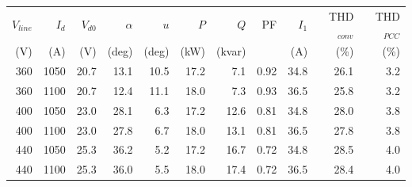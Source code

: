 \begin{tabular}{rrrrrrrrrrr}
\toprule
$V_{line}$ & $I_d$ & $V_{d0}$ & $\alpha$ & $u$ & $P$ & $Q$ & PF & $I_1$ & THD$_{conv}$ & THD$_{PCC}$\\
(V) & (A) & (V) & (deg) & (deg) & (kW) & (kvar) & & (A) & (\%) & (\%)\\
\midrule
360 & 1050 & 20.7 & 13.1 & 10.5 & 17.2 & 7.1 & 0.92 & 34.8 & 26.1 & 3.2\\
360 & 1100 & 20.7 & 12.4 & 11.1 & 18.0 & 7.3 & 0.93 & 36.5 & 25.8 & 3.2\\
400 & 1050 & 23.0 & 28.1 & 6.3 & 17.2 & 12.6 & 0.81 & 34.8 & 28.0 & 3.8\\
400 & 1100 & 23.0 & 27.8 & 6.7 & 18.0 & 13.1 & 0.81 & 36.5 & 27.8 & 3.8\\
440 & 1050 & 25.3 & 36.2 & 5.2 & 17.2 & 16.7 & 0.72 & 34.8 & 28.5 & 4.0\\
440 & 1100 & 25.3 & 36.0 & 5.5 & 18.0 & 17.4 & 0.72 & 36.5 & 28.4 & 4.0\\
\bottomrule
\end{tabular}
